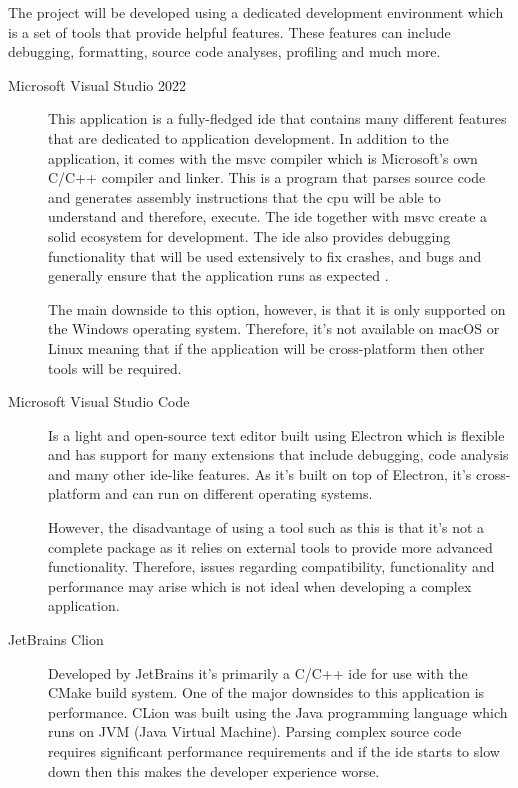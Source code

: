 \documentclass[11pt]{article}
\begin{document}
The project will be developed using a dedicated development environment which is
a set of tools that provide helpful features. These features can include
debugging, formatting, source code analyses, profiling and much more.

\begin{description}
  \item[Microsoft Visual Studio 2022] This application is a fully-fledged
    \gls*{ide} that contains many different features that are dedicated to
    application development. In addition to the application, it comes with the
    \gls*{msvc} compiler which is Microsoft's own C/C++ compiler and linker.
    This is a program that parses source code and generates assembly
    instructions that the \gls*{cpu} will be able to understand and therefore,
    execute. The \gls*{ide} together with \gls*{msvc} create a solid ecosystem
    for development. The \gls*{ide} also provides debugging functionality that
    will be used extensively to fix crashes, and bugs and generally ensure that
    the application runs as expected \cite{visualstudio}. 

    The main downside to this option, however, is that it is only supported on
    the Windows operating system. Therefore, it's not available on macOS or
    Linux meaning that if the application will be cross-platform then other
    tools will be required.

  \item[Microsoft Visual Studio Code] Is a light and open-source text editor
    built using Electron which is flexible and has support for many extensions
    that include debugging, code analysis and many other ide-like features. As
    it's built on top of Electron, it's cross-platform and can run on different
    operating systems.

    However, the disadvantage of using a tool such as this is that it's not a
    complete package as it relies on external tools to provide more advanced
    functionality. Therefore, issues regarding compatibility, functionality and
    performance may arise which is not ideal when developing a complex
    application.
  
  \item[JetBrains Clion] Developed by JetBrains it's primarily a C/C++
    \gls*{ide} for use with the CMake build system. One of the major downsides
    to this application is performance. CLion was built using the Java
    programming language which runs on JVM (Java Virtual Machine). Parsing
    complex source code requires significant performance requirements and if the
    \gls*{ide} starts to slow down then this makes the developer experience
    worse.
\end{description}
\end{document}
